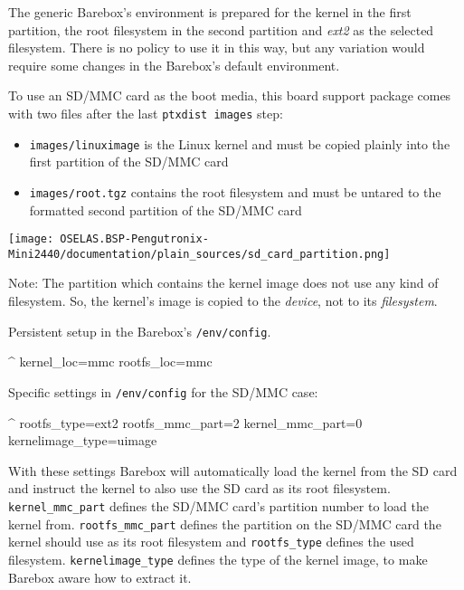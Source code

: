 The generic Barebox's environment is prepared for the kernel in the first partition,
the root filesystem in the second partition and \textit{ext2} as the selected
filesystem. There is no policy to use it in this way, but any variation would
require some changes in the Barebox's default environment.

To use an SD/MMC card as the boot media, this board support package comes with
two files after the last \texttt{ptxdist images} step:

\begin{itemize}
\item \texttt{\ptxdistPlatformDir images/linuximage} is the Linux kernel
	and must be copied plainly into the first partition of the SD/MMC card
\item \texttt{\ptxdistPlatformDir images/root.tgz} contains the root filesystem
	and must be untared to the formatted second partition of the SD/MMC card
\end{itemize}

\centerline{\texttt{[image: OSELAS.BSP-Pengutronix-Mini2440/documentation/plain\_sources/sd\_card\_partition.png]}}

Note: The partition which contains the kernel image does not use any kind of
filesystem. So, the kernel's image is copied to the \textit{device}, not to
its \textit{filesystem}.

Persistent setup in the Barebox's \texttt{/env/config}.

\begin{ptxshell}[escapechar=|]{^}
kernel_loc=mmc
rootfs_loc=mmc
\end{ptxshell}

Specific settings in \texttt{/env/config} for the SD/MMC case:

\begin{ptxshell}[escapechar=|]{^}
rootfs_type=ext2
rootfs_mmc_part=2
kernel_mmc_part=0
kernelimage_type=uimage
\end{ptxshell}

With these settings Barebox will automatically load the kernel from the SD card
and instruct the kernel to also use the SD card as its root filesystem.
\texttt{kernel\_mmc\_part} defines the SD/MMC card's partition number to load the
kernel from. \texttt{rootfs\_mmc\_part} defines the partition on the SD/MMC card
the kernel should use as its root filesystem and \texttt{rootfs\_type}
defines the used filesystem. \texttt{kernelimage\_type} defines the type of the
kernel image, to make Barebox aware how to extract it.

